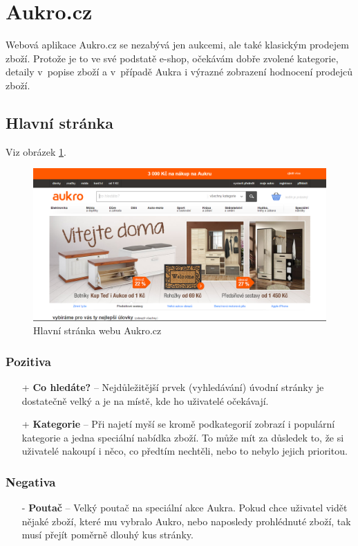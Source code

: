 \section{Aukro.cz}

\label{analyza:aukro}

Webová aplikace Aukro.cz \cite{aukro} se nezabývá jen aukcemi, ale také klasickým prodejem zboží. Protože je to ve své podstatě e-shop, očekávám dobře zvolené kategorie, detaily v~popise zboží a v~případě Aukra i výrazné zobrazení hodnocení prodejců zboží.

\subsection{Hlavní stránka}
Viz obrázek \ref{fig:aukro:home}.
\begin{figure}[h]
    \centering
    \includegraphics[width=1.0\textwidth]{media/aukro/home.png}
    \caption{Hlavní stránka webu Aukro.cz}
    \label{fig:aukro:home}
\end{figure}
\subsubsection*{Pozitiva}
\begin{itemize}
    \item[+] \textbf{Co hledáte?} -- Nejdůležitější prvek (vyhledávání) úvodní stránky je dostatečně velký a je na místě, kde ho uživatelé očekávají.
    \item[+] \textbf{Kategorie} -- Při najetí myší se kromě podkategorií zobrazí i populární kategorie a jedna speciální nabídka zboží. To může mít za důsledek to, že si uživatelé nakoupí i něco, co předtím nechtěli, nebo to nebylo jejich prioritou.
\end{itemize}
\subsubsection*{Negativa}
\begin{itemize}
    \item[-] \textbf{Poutač} -- Velký poutač na speciální akce Aukra. Pokud chce uživatel vidět nějaké zboží, které mu vybralo Aukro, nebo naposledy prohlédnuté zboží, tak musí přejít poměrně dlouhý kus stránky.
\end{itemize}



